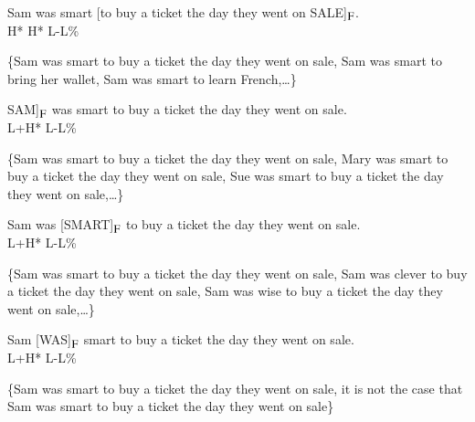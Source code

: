 \documentclass[11pt,fleqn]{article}
\newcommand{\foc}{$_{\mbox{\small F}}$}
\newcommand{\6}{\mbox{$[\hspace*{-.6mm}[$}}
\newcommand{\9}{\mbox{$]\hspace*{-.6mm}]$}}
\begin{document}
\begin{exe}

\ex\label{vp}

\begin{xlist}

\ex Sam was smart [to buy a ticket the day they went on SALE]\foc.
\\
\hspace*{1.8cm} H* \hspace*{5.8cm} H* \hspace*{.4cm} L-L\%

\ex \{Sam was smart to buy a ticket the day they went on sale, Sam was smart to bring her wallet, Sam was smart to learn French,\ldots\}


\end{xlist}

\ex\label{np} 
\begin{xlist}

\ex {[}SAM]\foc{} was smart to buy a ticket the day they went on sale.  \\
L+H* \hspace*{8cm} L-L\%

\ex \{Sam was smart to buy a ticket the day they went on sale, Mary was smart to buy a ticket the day they went on sale, Sue was smart to buy a ticket the day they went on sale,\ldots\}

\end{xlist}


\ex\label{adj}

\begin{xlist}

\ex Sam was [SMART]\foc{} to buy a ticket the day they went on sale.
\\
\hspace*{1.6cm} L+H* \hspace*{6.5cm} L-L\%

\ex \{Sam was smart to buy a ticket the day they went on sale, Sam was clever to buy a ticket the day they went on sale, Sam was wise to buy a ticket the day they went on sale,\ldots\}


\end{xlist}

\ex\label{aux} 

\begin{xlist}

\ex Sam [WAS]\foc{} smart to buy a ticket the day they went on sale.
\\
\hspace*{.8cm} L+H* \hspace*{7.2cm} L-L\%

\ex \{Sam was smart to buy a ticket the day they went on sale, it is not the case that Sam was smart to buy a ticket the day they went on sale\}
 
\end{xlist}


\end{exe}
\end{document}
